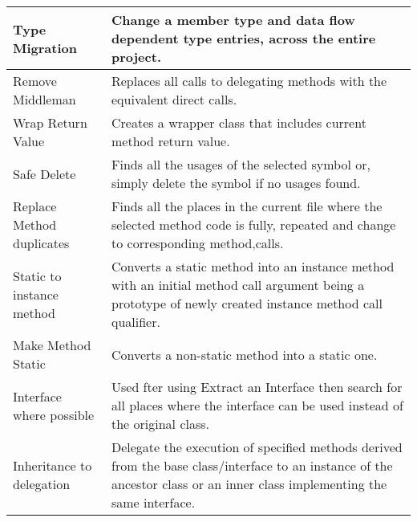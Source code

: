 \begin{table}[h]
\begin{tabular}{p{3 cm} | p{10.5 cm}}
Type Migration            & Change a member type and data flow dependent type entries, across the entire project.                                                                                     \\ \hline
Remove Middleman          & Replaces all calls to delegating methods with the equivalent direct calls.                                                                                                \\ \hline
Wrap Return Value         & Creates a wrapper class that includes current method return value.                                                                                                        \\ \hline
Safe Delete               & Finds all the usages of the selected symbol or, simply delete the symbol if no usages found.                                                                              \\ \hline
Replace Method duplicates & Finds all the places in the current file where the selected method code is fully, repeated and change to corresponding method,calls.                                      \\ \hline
Static to instance method & Converts a static method into an instance method with an initial method call argument being a prototype of newly created instance method call qualifier.                  \\ \hline
Make Method Static        & Converts a non-static method into a static one.                                                                                                                           \\ \hline
Interface where possible  & Used fter using Extract an Interface then search for all places where the interface can be used instead of the original class.                                            \\ \hline
Inheritance to delegation & Delegate the execution of specified methods derived from the base class/interface to an instance of the ancestor class or an inner class implementing the same interface. \\ \hline
\end{tabular}
\end{table}





